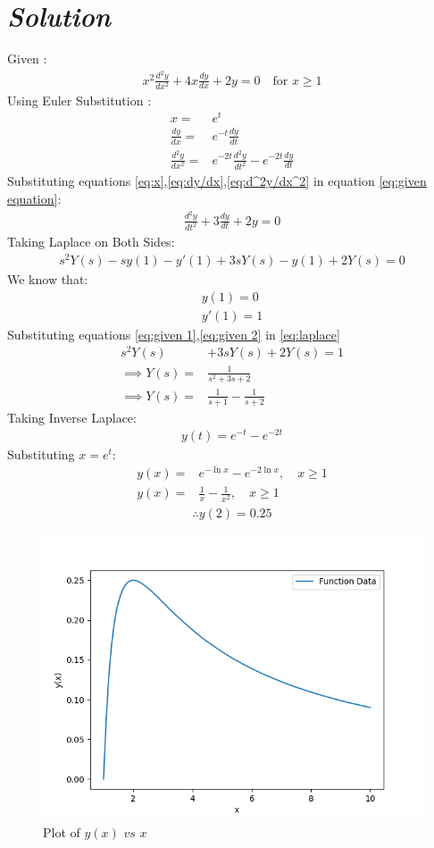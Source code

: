 \documentclass[journal,12pt,twocolumn]{IEEEtran}
\theoremstyle{remark}
\begin{document}
\section*{\textit{\textbf{Solution}}}
\noindent Given : 
\begin{align}
x^2\frac{d^2y}{dx^2} + 4x\frac{dy}{dx} + 2y = 0 \quad \text{for } x\geq 1 \label{eq:given equation}
\end{align}
Using Euler Substitution : 
\begin{align}
x= & e^t \label{eq:x}\\
\frac{dy}{dx}= & e^{-t}\frac{dy}{dt}\label{eq:dy/dx}\\
\frac{d^2y}{dx^2} = & e^{-2t}\frac{d^2y}{dt^2} - e^{-2t}\frac{dy}{dt}\label{eq:d^2y/dx^2}
\end{align}
Substituting equations \eqref{eq:x},\eqref{eq:dy/dx},\eqref{eq:d^2y/dx^2} in equation \eqref{eq:given equation}:
\begin{align}
\frac{d^2y}{dt^2} + 3\frac{dy}{dt} + 2y = 0
\end{align}
Taking Laplace on Both Sides:
\begin{align}
s^2 Y(s) - sy(1)-y'(1) + 3{sY(s) - y(1)} + 2Y(s)= 0\label{eq:laplace}
\end{align}
We know that:
\begin{align}
y(1)=0\label{eq:given 1}\\
y'(1)=1\label{eq:given 2}
\end{align}
Substituting equations \eqref{eq:given 1},\eqref{eq:given 2} in \eqref{eq:laplace}
\begin{align}
s^2Y(s)& + 3sY(s) +2Y(s)= 1\\
\implies Y(s)=&\frac{1}{s^2 + 3s + 2 }\\
\implies Y(s)=&\frac{1}{s+1} - \frac{1}{s+2}
\end{align}
Taking Inverse Laplace:
\begin{align}
y(t) = e^{-t} - e^{-2t}
\end{align}
Substituting $x=e^t$:
\begin{align}
y(x)=& e^{-\ln{x}} - e^{-2\ln{x}},\quad x\geq 1 \\
y(x)=& \frac{1}{x} - \frac{1}{x^2},\quad x\geq 1 
\end{align}
\begin{align}
    \therefore y(2) = 0.25
\end{align}
\begin{figure}[ht]
    \centering
    \includegraphics[width=\columnwidth]{figs/fig.png}
	\caption{Plot of $y(x)$ $vs$ $x$}
    \label{fig: GATE AE-54(2023)}
\end{figure}
\end{document}
